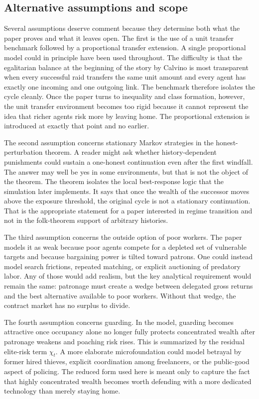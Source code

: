 \subsection{Alternative assumptions and scope}

Several assumptions deserve comment because they determine both what the paper proves and what it leaves open. The first is the use of a unit transfer benchmark followed by a proportional transfer extension. A single proportional model could in principle have been used throughout. The difficulty is that the egalitarian balance at the beginning of the story by Calvino is most transparent when every successful raid transfers the same unit amount and every agent has exactly one incoming and one outgoing link. The benchmark therefore isolates the cycle cleanly. Once the paper turns to inequality and class formation, however, the unit transfer environment becomes too rigid because it cannot represent the idea that richer agents risk more by leaving home. The proportional extension is introduced at exactly that point and no earlier.

The second assumption concerns stationary Markov strategies in the honest-perturbation theorem. A reader might ask whether history-dependent punishments could sustain a one-honest continuation even after the first windfall. The answer may well be yes in some environments, but that is not the object of the theorem. The theorem isolates the local best-response logic that the simulation later implements. It says that once the wealth of the successor moves above the exposure threshold, the original cycle is not a stationary continuation. That is the appropriate statement for a paper interested in regime transition and not in the folk-theorem support of arbitrary histories.

The third assumption concerns the outside option of poor workers. The paper models it as weak because poor agents compete for a depleted set of vulnerable targets and because bargaining power is tilted toward patrons. One could instead model search frictions, repeated matching, or explicit auctioning of predatory labor. Any of those would add realism, but the key analytical requirement would remain the same: patronage must create a wedge between delegated gross returns and the best alternative available to poor workers. Without that wedge, the contract market has no surplus to divide.

The fourth assumption concerns guarding. In the model, guarding becomes attractive once occupancy alone no longer fully protects concentrated wealth after patronage weakens and poaching risk rises. This is summarized by the residual elite-risk term $\chi_t$. A more elaborate microfoundation could model betrayal by former hired thieves, explicit coordination among freelancers, or the public-good aspect of policing. The reduced form used here is meant only to capture the fact that highly concentrated wealth becomes worth defending with a more dedicated technology than merely staying home.

